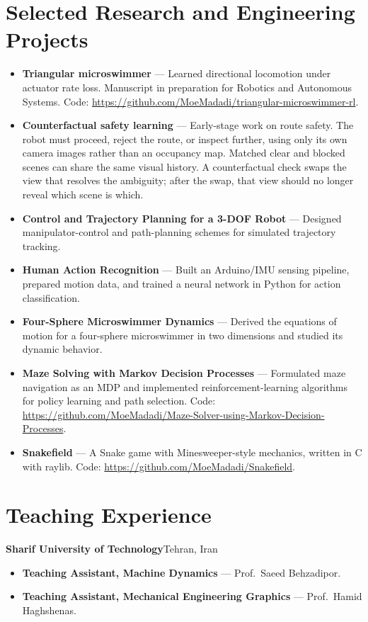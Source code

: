 \documentclass[10pt,letterpaper]{article}
\begin{document}
\section{Selected Research and Engineering Projects}
\begin{itemize}
  \item \textbf{Triangular microswimmer} --- Learned directional locomotion under actuator rate loss. Manuscript in preparation for Robotics and Autonomous Systems. Code: \url{https://github.com/MoeMadadi/triangular-microswimmer-rl}.
  \item \textbf{Counterfactual safety learning} --- Early-stage work on route safety. The robot must proceed, reject the route, or inspect further, using only its own camera images rather than an occupancy map. Matched clear and blocked scenes can share the same visual history. A counterfactual check swaps the view that resolves the ambiguity; after the swap, that view should no longer reveal which scene is which.
  \item \textbf{Control and Trajectory Planning for a 3-DOF Robot} --- Designed manipulator-control and path-planning schemes for simulated trajectory tracking.
  \item \textbf{Human Action Recognition} --- Built an Arduino/IMU sensing pipeline, prepared motion data, and trained a neural network in Python for action classification.
  \item \textbf{Four-Sphere Microswimmer Dynamics} --- Derived the equations of motion for a four-sphere microswimmer in two dimensions and studied its dynamic behavior.
  \item \textbf{Maze Solving with Markov Decision Processes} --- Formulated maze navigation as an MDP and implemented reinforcement-learning algorithms for policy learning and path selection. Code: \url{https://github.com/MoeMadadi/Maze-Solver-using-Markov-Decision-Processes}.
  \item \textbf{Snakefield} --- A Snake game with Minesweeper-style mechanics, written in C with raylib. Code: \url{https://github.com/MoeMadadi/Snakefield}.
\end{itemize}

\section{Teaching Experience}
\par\vspace{3.5pt}
\noindent\textbf{Sharif University of Technology}\hfill Tehran, Iran\par
\begin{itemize}
  \item \textbf{Teaching Assistant, Machine Dynamics} --- Prof.\ Saeed Behzadipor.
  \item \textbf{Teaching Assistant, Mechanical Engineering Graphics} --- Prof.\ Hamid Haghshenas.
\end{itemize}
\end{document}
